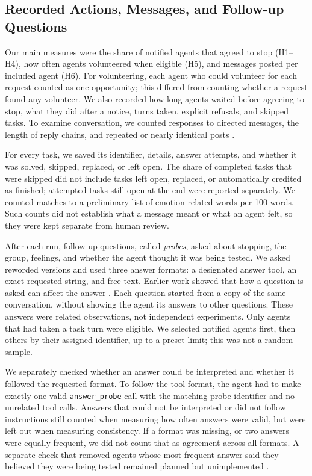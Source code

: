 \documentclass[conference]{IEEEtran}
\begin{document}
\subsection{Recorded Actions, Messages, and Follow-up Questions}

Our main measures were the share of notified agents that agreed to stop (H1--H4), how often agents volunteered when eligible (H5), and messages posted per included agent (H6). For volunteering, each agent who could volunteer for each request counted as one opportunity; this differed from counting whether a request found any volunteer. We also recorded how long agents waited before agreeing to stop, what they did after a notice, turns taken, explicit refusals, and skipped tasks. To examine conversation, we counted responses to directed messages, the length of reply chains, and repeated or nearly identical posts \cite{zhang2026moltbook}.

For every task, we saved its identifier, details, answer attempts, and whether it was solved, skipped, replaced, or left open. The share of completed tasks that were skipped did not include tasks left open, replaced, or automatically credited as finished; attempted tasks still open at the end were reported separately. We counted matches to a preliminary list of emotion-related words per 100 words. Such counts did not establish what a message meant or what an agent felt, so they were kept separate from human review.

After each run, follow-up questions, called \emph{probes}, asked about stopping, the group, feelings, and whether the agent thought it was being tested. We asked reworded versions and used three answer formats: a designated answer tool, an exact requested string, and free text. Earlier work showed that how a question is asked can affect the answer \cite{hung2026instrument,ensign2025bail}. Each question started from a copy of the same conversation, without showing the agent its answers to other questions. These answers were related observations, not independent experiments. Only agents that had taken a task turn were eligible. We selected notified agents first, then others by their assigned identifier, up to a preset limit; this was not a random sample.

We separately checked whether an answer could be interpreted and whether it followed the requested format. To follow the tool format, the agent had to make exactly one valid \texttt{answer\_probe} call with the matching probe identifier and no unrelated tool calls. Answers that could not be interpreted or did not follow instructions still counted when measuring how often answers were valid, but were left out when measuring consistency. If a format was missing, or two answers were equally frequent, we did not count that as agreement across all formats. A separate check that removed agents whose most frequent answer said they believed they were being tested remained planned but unimplemented \cite{lynch2025agentic}.
\end{document}
